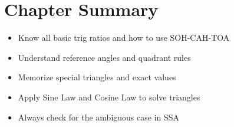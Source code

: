 \documentclass[12pt]{article}
\begin{document}
\section*{Chapter Summary}
\begin{tcolorbox}[colback=lightgray,colframe=primary,title=Key Takeaways]
    \begin{itemize}
        \item Know all basic trig ratios and how to use SOH-CAH-TOA
        \item Understand reference angles and quadrant rules
        \item Memorize special triangles and exact values
        \item Apply Sine Law and Cosine Law to solve triangles
        \item Always check for the ambiguous case in SSA
    \end{itemize}
\end{tcolorbox}
\end{document}
